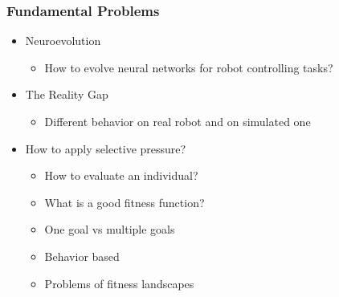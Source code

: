 \documentclass[8pt]{beamer}
\begin{document}
\begin{frame}
\frametitle{Fundamental Problems}
\begin{itemize}
	\item Neuroevolution
	\begin{itemize}
		\item How to evolve neural networks for robot controlling tasks?
	\end{itemize}
	\item The Reality Gap
	\begin{itemize}
		\item Different behavior on real robot and on simulated one
	\end{itemize}
	\item How to apply selective pressure?
	\begin{itemize}
		\item How to evaluate an individual?
		\item What is a good fitness function?
		\item One goal vs multiple goals
		\item Behavior based
		\item Problems of fitness landscapes
	\end{itemize}
	
\end{itemize}
\end{frame}
\end{document}
